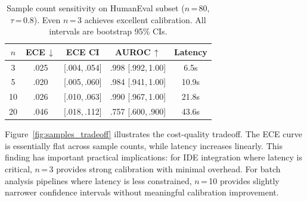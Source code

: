 \documentclass{article}
\begin{document}
\begin{table}[t]
\centering
\caption{Sample count sensitivity on HumanEval subset ($n$\,=\,80, $\tau$\,=\,0.8). Even $n$\,=\,3 achieves excellent calibration. All intervals are bootstrap 95\% CIs.}
\label{tab:samples}
\small
\setlength{\tabcolsep}{2.5pt}
\begin{tabular}{@{}ccccc@{}}
\toprule
$n$ & \textbf{ECE\,$\downarrow$} & \textbf{ECE CI} & \textbf{AUROC\,$\uparrow$} & \textbf{Latency} \\
\midrule
3  & .025 & {\scriptsize[.004,\,.054]} & .998 {\scriptsize[.992,\,1.00]} & 6.5s \\
5  & .020 & {\scriptsize[.005,\,.060]} & .984 {\scriptsize[.941,\,1.00]} & 10.9s \\
10 & .026 & {\scriptsize[.010,\,.063]} & .990 {\scriptsize[.967,\,1.00]} & 21.8s \\
20 & .046 & {\scriptsize[.018,\,.112]} & .757 {\scriptsize[.600,\,.900]} & 43.6s \\
\bottomrule
\end{tabular}
\vspace{-0.5em}
\end{table}

Figure~\ref{fig:samples_tradeoff} illustrates the cost-quality tradeoff. The ECE curve is essentially flat across sample counts, while latency increases linearly. This finding has important practical implications: for IDE integration where latency is critical, $n$\,=\,3 provides strong calibration with minimal overhead. For batch analysis pipelines where latency is less constrained, $n$\,=\,10 provides slightly narrower confidence intervals without meaningful calibration improvement.
\end{document}
